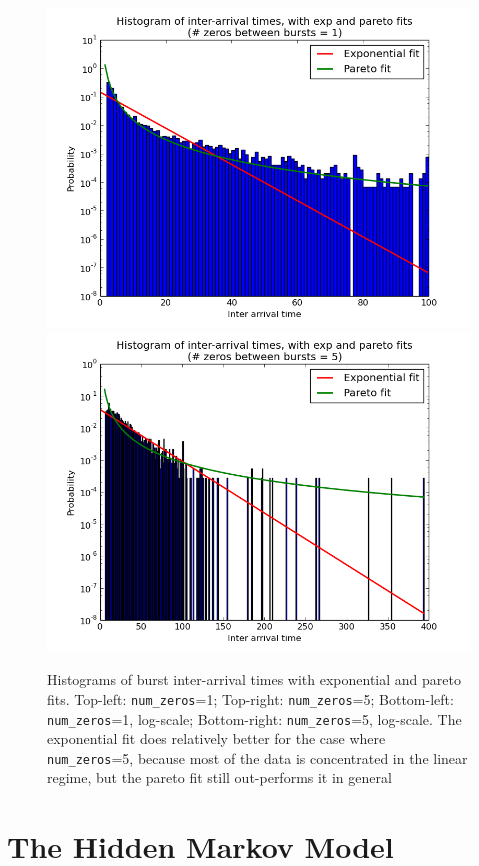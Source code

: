 \documentclass[11pt, twoside]{article}
\begin{document}
\begin{figure}[h!]
	\includegraphics[scale = 0.35]{ipt-1-log}
	\includegraphics[scale = 0.35]{ipt-5-log}
	\caption{Histograms of burst inter-arrival times with exponential and pareto fits. Top-left: \texttt{num\_zeros}=1; Top-right: \texttt{num\_zeros}=5; Bottom-left: \texttt{num\_zeros}=1, log-scale; Bottom-right: \texttt{num\_zeros}=5, log-scale. The exponential fit does relatively better for the case where \texttt{num\_zeros}=5, because most of the data is concentrated in the linear regime, but the pareto fit still out-performs it in general}
	\label{fig:burst-statistics}
\end{figure}

\section{The Hidden Markov Model}
\end{document}
